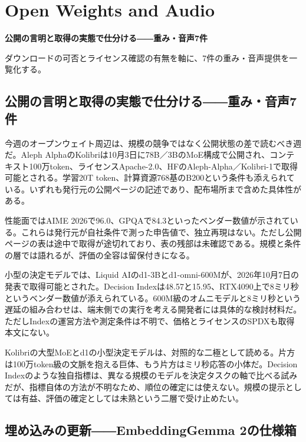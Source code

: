 \section{Open Weights and Audio}
\begin{wideflow}
{\Large\bfseries 公開の言明と取得の実態で仕分ける――重み・音声7件\par}
\smallskip
{\color{SurveyMuted}ダウンロードの可否とライセンス確認の有無を軸に、7件の重み・音声提供を一覧化する。\par}
\end{wideflow}

\subsection*{公開の言明と取得の実態で仕分ける――重み・音声7件}

今週のオープンウェイト周辺は、規模の競争ではなく公開状態の差で読むべき週だ。Aleph AlphaのKolibriは10月3日に78B／3BのMoE構成で公開され、コンテキスト100万token、ライセンスApache-2.0、HFのAleph-Alpha／Kolibri-1で取得可能とされる。学習20T token、計算資源768基のB200という条件も添えられている。いずれも発行元の公開ページの記述であり、配布場所まで含めた具体性がある。\cite{kolibri}

性能面ではAIME 2026で96.0、GPQAで84.3といったベンダー数値が示されている。これらは発行元が自社条件で測った申告値で、独立再現はない。ただし公開ページの表は途中で取得が途切れており、表の残部は未確認である。規模と条件の層では語れるが、評価の全容は留保付きになる。\cite{kolibri}

小型の決定モデルでは、Liquid AIのd1-3Bとd1-omni-600Mが、2026年10月7日の発表で取得可能とされた。Decision Indexは48.57と15.95、RTX4090上で8ミリ秒というベンダー数値が添えられている。600M級のオムニモデルと8ミリ秒という遅延の組み合わせは、端末側での実行を考える開発者には具体的な検討材料だ。ただしIndexの運営方法や測定条件は不明で、価格とライセンスのSPDXも取得本文にない。\cite{liquidd1}

Kolibriの大型MoEとd1の小型決定モデルは、対照的な二極として読める。片方は100万token級の文脈を抱える巨体、もう片方はミリ秒応答の小体だ。Decision Indexのような独自指標は、異なる規模のモデルを決定タスクの軸で比べる試みだが、指標自体の方法が不明なため、順位の確定には使えない。規模の提示としては有益、評価の確定としては未熟という二層で受け止めたい。\cite{liquidd1}

\subsection*{埋め込みの更新――EmbeddingGemma 2の仕様箱}


